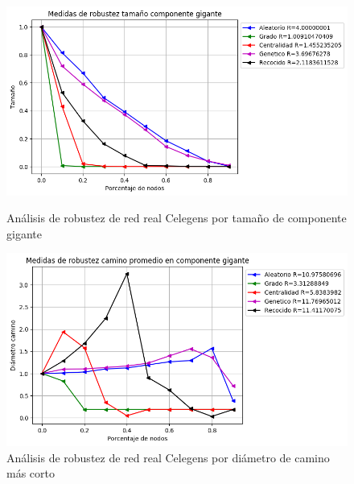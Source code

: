 \begin{figure}[!htb]
    \begin{minipage}{0.48\textwidth}
        \centering
        \includegraphics[scale=0.4]{CapituloAAnexos/imagenesAnexoC/Robustez/grafica_GC20180508_020345Celengs}
        \caption{Análisis de robustez de red real Celegens por tamaño de componente gigante}
    \end{minipage}\hfill
   \begin{minipage}{0.48\textwidth}
         \centering
       \includegraphics[scale=0.4]{CapituloAAnexos/imagenesAnexoC/Robustez/grafica_APL20180508_020345Celengs}
        \caption{Análisis de robustez de red real Celegens por diámetro de camino más corto}
    \end{minipage}
\end{figure}

